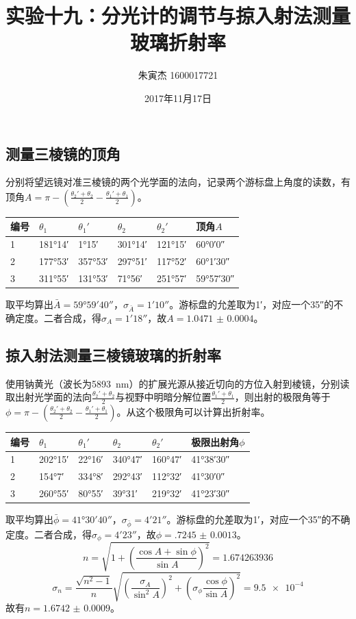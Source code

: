 \documentclass[UTF8]{ctexart}
\title{实验十九：分光计的调节与掠入射法测量玻璃折射率}
\author{朱寅杰 1600017721}
\date{2017年11月17日}
\begin{document}
\maketitle

\subsection{测量三棱镜的顶角}
分别将望远镜对准三棱镜的两个光学面的法向，记录两个游标盘上角度的读数，有顶角$A=\pi-(\frac{\theta_2'+\theta_2}{2}-\frac{\theta_1'+\theta_1}{2})$。
\begin{center}
\noindent
\begin{tabu} to 0.7\linewidth {X[c,-1]|X[c,-10] X[c,-10]|X[c,-10] X[c,-10]||X[c]}
\hline
编号	&$\theta_1$	&$\theta_1'$	&$\theta_2$	&$\theta_2'$	&顶角$A$
\\
	&\ang{181;14;}	&\ang{1;15;}	&\ang{301;14;}	&\ang{121;15;}	&\ang{60;0;0}
\\
2	&\ang{177;53;}	&\ang{357;53;}	&\ang{297;51;}	&\ang{117;52;}	&\ang{60;1;30}
\\
3	&\ang{311;55;}	&\ang{131;53;}	&\ang{71;56;}	&\ang{251;57;}	&\ang{59;57;30}
\\
\hline
\end{tabu}
\end{center}
取平均算出$\bar{A}=\ang{59;59;40}$，$\sigma_{\bar{A}}=\ang{;1;10}$。游标盘的允差取为\ang{;1;}，对应一个\ang{;;35}的不确定度。二者合成，得$\sigma_A=\ang{;1;18}$，故$A=\num{1.0471(4)}$。

\subsection{掠入射法测量三棱镜玻璃的折射率}
使用钠黄光（波长为\SI{5893}{\nm}）的扩展光源从接近切向的方位入射到棱镜，分别读取出射光学面的法向$\frac{\theta_2'+\theta_2}{2}$与视野中明暗分解位置$\frac{\theta_1'+\theta_1}{2}$，则出射的极限角等于$\phi=\pi-(\frac{\theta_2'+\theta_2}{2}-\frac{\theta_1'+\theta_1}{2})$。从这个极限角可以计算出折射率。
\begin{center}
\noindent
\begin{tabu} to 0.7\linewidth {X[c,-1]|X[c,-10] X[c,-10]|X[c,-10] X[c,-10]||X[c]}
\hline
编号	&$\theta_1$	&$\theta_1'$	&$\theta_2$	&$\theta_2'$	&极限出射角$\phi$
\\
	&\ang{202;15;}	&\ang{22;16;}	&\ang{340;47;}	&\ang{160;47;}	&\ang{41;38;30}
\\
2	&\ang{154;7;}	&\ang{334;8;}	&\ang{292;43;}	&\ang{112;32;}	&\ang{41;30;0}
\\
3	&\ang{260;55;}	&\ang{80;55;}	&\ang{39;31;}	&\ang{219;32;}	&\ang{41;23;30}
\\
\hline
\end{tabu}
\end{center}
取平均算出$\bar{\phi}=\ang{41;30;40}$，$\sigma_{\bar{\phi}}=\ang{;4;21}$。游标盘的允差取为\ang{;1;}，对应一个\ang{;;35}的不确定度。二者合成，得$\sigma_{\phi}=\ang{;4;23}$，故$\phi=\num{.7245(13)}$。
\[
n=\sqrt{1+(\frac{\cos{A}+\sin\phi}{\sin{A}})^2}=\num{1.674263936}
\]
\[
\sigma_n=\frac{\sqrt{n^2-1}}{n}\sqrt{(\frac{\sigma_A}{\sin^2A})^2+(\sigma_{\phi}\frac{\cos{\phi}}{\sin{A}})^2}=\num{9.5e-4}
\]
故有$n=\num{1.6742(9)}$。
\end{document}
